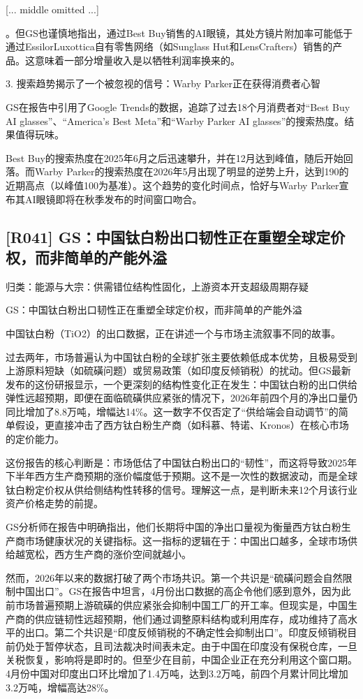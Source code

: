 \documentclass[11pt]{ctexart}
\begin{document}
[... middle omitted ...]

。但GS也谨慎地指出，通过Best Buy销售的AI眼镜，其处方镜片附加率可能低于通过EssilorLuxottica自有零售网络（如Sunglass Hut和LensCrafters）销售的产品。这意味着一部分增量收入是以牺牲利润率换来的。

3. 搜索趋势揭示了一个被忽视的信号：Warby Parker正在获得消费者心智

GS在报告中引用了Google Trends的数据，追踪了过去18个月消费者对“Best Buy AI glasses”、“America’s Best Meta”和“Warby Parker AI glasses”的搜索热度。结果值得玩味。

Best Buy的搜索热度在2025年6月之后迅速攀升，并在12月达到峰值，随后开始回落。而Warby Parker的搜索热度在2026年5月出现了明显的逆势上升，达到190的近期高点（以峰值100为基准）。这个趋势的变化时间点，恰好与Warby Parker宣布其AI眼镜即将在秋季发布的时间窗口吻合。

\subsection{[R041] GS：中国钛白粉出口韧性正在重塑全球定价权，而非简单的产能外溢}
{\small\color{refgray}归类：能源与大宗：供需错位结构性固化，上游资本开支超级周期存疑}

GS：中国钛白粉出口韧性正在重塑全球定价权，而非简单的产能外溢

中国钛白粉（TiO2）的出口数据，正在讲述一个与市场主流叙事不同的故事。

过去两年，市场普遍认为中国钛白粉的全球扩张主要依赖低成本优势，且极易受到上游原料短缺（如硫磺问题）或贸易政策（如印度反倾销税）的扰动。但GS最新发布的这份研报显示，一个更深刻的结构性变化正在发生：中国钛白粉的出口供给弹性远超预期，即便在面临硫磺供应紧张的情况下，2026年前四个月的净出口量仍同比增加了8.8万吨，增幅达14\%。这一数字不仅否定了“供给端会自动调节”的简单假设，更直接冲击了西方钛白粉生产商（如科慕、特诺、Kronos）在核心市场的定价能力。

这份报告的核心判断是：市场低估了中国钛白粉出口的“韧性”，而这将导致2025年下半年西方生产商预期的涨价幅度低于预期。这不是一次性的数据波动，而是全球钛白粉定价权从供给侧结构性转移的信号。理解这一点，是判断未来12个月该行业资产价格走势的前提。

GS分析师在报告中明确指出，他们长期将中国的净出口量视为衡量西方钛白粉生产商市场健康状况的关键指标。这一指标的逻辑在于：中国出口越多，全球市场供给越宽松，西方生产商的涨价空间就越小。

然而，2026年以来的数据打破了两个市场共识。第一个共识是“硫磺问题会自然限制中国出口”。GS在报告中坦言，4月份出口数据的高企令他们感到意外，因为此前市场普遍预期上游硫磺的供应紧张会抑制中国工厂的开工率。但现实是，中国生产商的供应链韧性远超预期，他们通过调整原料结构或利用库存，成功维持了高水平的出口。第二个共识是“印度反倾销税的不确定性会抑制出口”。印度反倾销税目前仍处于暂停状态，且司法裁决时间表未定。由于中国在印度没有保税仓库，一旦关税恢复，影响将是即时的。但至少在目前，中国企业正在充分利用这个窗口期。4月份中国对印度出口环比增加了1.4万吨，达到3.2万吨，前四个月累计同比增加3.2万吨，增幅高达28\%。
\end{document}
